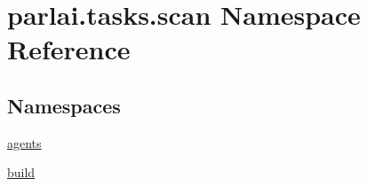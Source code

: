\hypertarget{namespaceparlai_1_1tasks_1_1scan}{}\section{parlai.\+tasks.\+scan Namespace Reference}
\label{namespaceparlai_1_1tasks_1_1scan}
\subsection*{Namespaces}
\begin{DoxyCompactItemize}
\item 
 \hyperlink{namespaceparlai_1_1tasks_1_1scan_1_1agents}{agents}
\item 
 \hyperlink{namespaceparlai_1_1tasks_1_1scan_1_1build}{build}
\end{DoxyCompactItemize}

